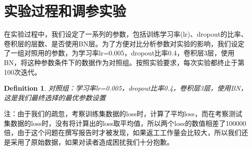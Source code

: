 \documentclass[11pt]{article}
\newtheorem{definition}[theorem]{Definition}
\begin{document}
\section{实验过程和调参实验}
在实验过程中，我们设定了一系列的参数，包括训练学习率(lr)、dropout的比率、卷积层的层数、是否使用BN层。为了方便对比分析参数对实验的影响，我们设定了一组对照用的参数，为学习率lr=0.005，dropout比率0.4，卷积层3层，使用BN，将这种参数条件下的数据作为对照组。按照实验要求，每次实验都终止于第100次迭代。\par
\begin{definition}
对照组：学习率lr=0.005，dropout比率0.4，卷积层3层，使用BN，这是我们最终选择的最优参数设置
\end{definition}
注：由于我们的疏忽，考察训练集数据的loss时，计算了平均loss，而在考察测试集数据的loss时，没有将计算出的loss取平均值，所以两个loss的数值相差了100000倍，由于这个问题在撰写报告时才被发现，如果返工工作量会比较大，所以我们还是采用了原始数据，如果对读者造成困扰我们十分抱歉。
\end{document}
